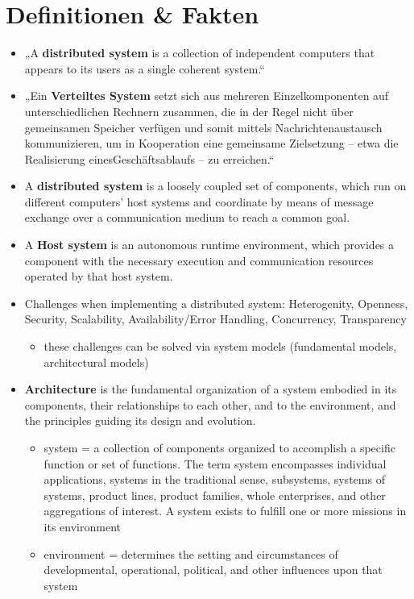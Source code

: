 \documentclass[11pt]{article}
\author{eo shiru}
\date{\today}
\title{}
\begin{document}
\tableofcontents


\section{Definitionen \& Fakten}
\label{sec:org2121cbb}
\begin{itemize}
\item „A \textbf{distributed system} is a collection of independent computers that appears to its users as a single coherent system.“
\item „Ein \textbf{Verteiltes System} setzt sich aus mehreren Einzelkomponenten auf unterschiedlichen Rechnern zusammen, die in der Regel nicht über gemeinsamen Speicher verfügen und somit mittels Nachrichtenaustausch kommunizieren, um in Kooperation eine gemeinsame Zielsetzung – etwa die Realisierung einesGeschäftsablaufs – zu erreichen.“
\item A \textbf{distributed system} is a loosely coupled set of components, which run on different computers’ host systems and coordinate by means of message exchange over a communication medium to reach a common goal.
\item A \textbf{Host system} is an autonomous runtime environment, which provides a component with the necessary execution and communication resources operated by that host system.
\item Challenges when implementing a distributed system: Heterogenity, Openness, Security, Scalability, Availability/Error Handling, Concurrency, Transparency
\begin{itemize}
\item these challenges can be solved via system models (fundamental models, architectural models)
\end{itemize}
\item \textbf{Architecture} is the fundamental organization of a system embodied in its components, their relationships to each other, and to the environment, and the principles guiding its design and evolution.
\begin{itemize}
\item system = a collection of components organized to accomplish a specific function or set of functions. The term system encompasses individual applications, systems in the traditional sense, subsystems, systems of systems, product lines, product families, whole enterprises, and other aggregations of interest. A system exists to fulfill one or more missions in its environment
\item environment = determines the setting and circumstances of developmental, operational, political, and other influences upon that system

\end{itemize}
\end{itemize}
\end{document}
